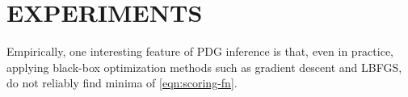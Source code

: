 \documentclass{article}
\begin{document}
%
%
\section{EXPERIMENTS} \label{sec:expts}

Empirically, one interesting feature of PDG inference is that, even in practice, applying black-box optimization methods such as gradient descent and LBFGS, do not reliably find minima of \eqref{eqn:scoring-fn}.
\end{document}
